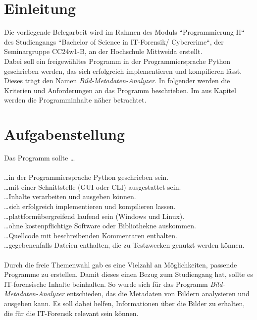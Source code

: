 \documentclass{Bild-Metadaten-Analyzer}
\begin{document}
\section{Einleitung}\label{sec:Einleitung}
Die vorliegende Belegarbeit wird im Rahmen des Moduls ``Programmierung II`` des Studiengangs ``Bachelor of Science in IT-Forensik/ 
Cybercrime``, der Seminargruppe CC24w1-B, an der Hochschule Mittweida erstellt.\\
Dabei soll ein freigewähltes Programm in der Programmiersprache Python geschrieben werden, das sich erfolgreich implementieren und 
kompilieren lässt. Dieses trägt den Namen \textit{Bild-Metadaten-Analyzer}. In folgender 
werden die Kriterien und Anforderungen an das Programm beschrieben. Im  aus Kapitel 
 werden die Programminhalte näher betrachtet.
\clearpage

\section{Aufgabenstellung}\label{sec:Aufgabenstellung}
Das Programm sollte \ldots \\
\\\ldots in der Programmiersprache Python geschrieben sein.
\\\ldots mit einer Schnittstelle (GUI oder CLI) ausgestattet sein.
\\\ldots Inhalte verarbeiten und ausgeben können.
\\\ldots sich erfolgreich implementieren und kompilieren lassen.
\\\ldots plattformübergreifend laufend sein (Windows und Linux).
\\\ldots ohne kostenpflichtige Software oder Bibliothekne auskommen.
\\\ldots Quellcode mit beschreibenden Kommentaren enthalten.
\\\ldots gegebenenfalls Dateien enthalten, die zu Testzwecken genutzt werden können.\\
\\ Durch die freie Themenwahl gab es eine Vielzahl an Möglichkeiten, passende Programme zu erstellen. Damit dieses einen Bezug zum 
Studiengang hat, sollte es IT-forensische Inhalte beinhalten. So wurde sich für das Programm \textit{Bild-Metadaten-Analyzer} 
entschieden, das die Metadaten von Bildern analysieren und ausgeben kann. Es soll dabei helfen, Informationen über die Bilder zu 
erhalten, die für die IT-Forensik relevant sein können.
\clearpage
\end{document}
